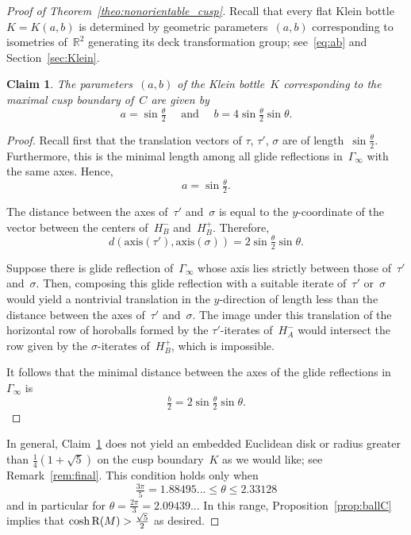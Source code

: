 \documentclass[11pt,reqno]{amsart}
\newtheorem{lemma}[theorem]{Lemma}
\newtheorem{claim}[theorem]{Claim}
\theoremstyle{definition}
\numberwithin{equation}{section}
\newcommand\R {{\mathbb R}}
\newcommand\RR{{\rm R}}
\numberwithin{equation}{section}
\begin{document}
\begin{proof}[Proof of Theorem~\ref{theo:nonorientable_cusp}]
\medskip

Recall that every flat Klein bottle $K=K(a,b)$ is determined by geometric parameters~$(a,b)$ corresponding to isometries of~$\R^2$ generating its deck transformation group; see~\eqref{eq:ab} and Section~\ref{sec:Klein}.

\begin{claim} \label{claim:ab}
The parameters~$(a,b)$ of the Klein bottle~$K$ corresponding to the maximal cusp boundary of~$C$ are given by 
\[
a=\sin \tfrac{\theta}{2} \quad \mbox{ and } \quad b = 4 \sin \tfrac{\theta}{2} \sin \theta.
\] 
\end{claim}



\begin{proof}
Recall first that the translation vectors of $\tau$, $\tau'$, $\sigma$ are of length~$\sin \frac{\theta}{2}$.
Furthermore, this is the minimal length among all glide reflections in~$\Gamma_\infty$ with the same axes.
Hence, 
\[
a=\sin \tfrac{\theta}{2}.
\]

The distance between the axes of~$\tau'$ and~$\sigma$ is equal to the $y$-coordinate of the vector between the centers of~$H_B^-$ and~$H_B^+$.
Therefore,
\[
d(\textrm{axis}(\tau'),\textrm{axis}(\sigma)) = 2 \sin \tfrac{\theta}{2} \sin \theta.
\]

Suppose there is glide reflection of~$\Gamma_\infty$ whose axis lies strictly between those of~$\tau'$ and~$\sigma$.
Then, composing this glide reflection with a suitable iterate of~$\tau'$ or~$\sigma$ would yield a nontrivial translation in the $y$-direction of length less than the distance between the axes of~$\tau'$ and~$\sigma$.
The image under this translation of the horizontal row of horoballs formed by the $\tau'$-iterates of~$H_A^-$ would intersect the row given by the $\sigma$-iterates of~$H_B^+$, which is impossible.

It follows that the minimal distance between the axes of the glide reflections in~$\Gamma_\infty$ is 
\[
\tfrac{b}{2}=2 \sin \tfrac{\theta}{2} \sin \theta.
\]
\end{proof}

In general, Claim~\ref{claim:ab} does not yield an embedded Euclidean disk or radius greater than $\frac{1}{4} (1+\sqrt{5})$ on the cusp boundary~$K$ as we would like; see Remark~\ref{rem:final}.
This condition holds only when 
\[
\tfrac{3\pi}{5}= 1.88495... \leq \theta \leq 2.33128
\]
and in particular for $\theta = \frac{2\pi}{3} = 2.09439...$
In this range, Proposition~\ref{prop:ballC} implies that $\cosh \RR(M) > \frac{\sqrt{5}}{2}$ as desired.


\end{proof}
\end{document}
